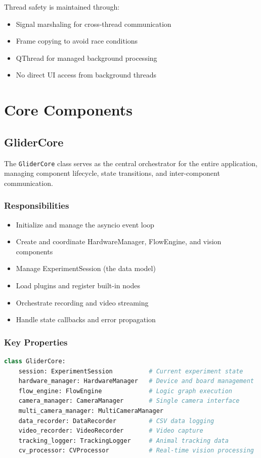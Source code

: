 \documentclass[11pt,a4paper]{article}
\begin{document}
Thread safety is maintained through:
\begin{itemize}    \item Signal marshaling for cross-thread communication
    \item Frame copying to avoid race conditions
    \item QThread for managed background processing
    \item No direct UI access from background threads
\end{itemize}

\section{Core Components}

\subsection{GliderCore}

The \texttt{GliderCore} class serves as the central orchestrator for the entire application, managing component lifecycle, state transitions, and inter-component communication.

\subsubsection{Responsibilities}

\begin{itemize}    \item Initialize and manage the asyncio event loop
    \item Create and coordinate HardwareManager, FlowEngine, and vision components
    \item Manage ExperimentSession (the data model)
    \item Load plugins and register built-in nodes
    \item Orchestrate recording and video streaming
    \item Handle state callbacks and error propagation
\end{itemize}

\subsubsection{Key Properties}

\begin{lstlisting}[language=Python]
class GliderCore:
    session: ExperimentSession          # Current experiment state
    hardware_manager: HardwareManager   # Device and board management
    flow_engine: FlowEngine             # Logic graph execution
    camera_manager: CameraManager       # Single camera interface
    multi_camera_manager: MultiCameraManager
    data_recorder: DataRecorder         # CSV data logging
    video_recorder: VideoRecorder       # Video capture
    tracking_logger: TrackingLogger     # Animal tracking data
    cv_processor: CVProcessor           # Real-time vision processing
\end{lstlisting}
\end{document}

